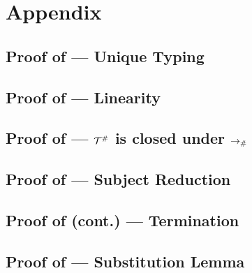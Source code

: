 \chapter{Appendix}

\section{Proof of  --- Unique Typing}
\label{unique_typing_proof}


\section{Proof of  --- Linearity}
\label{linearity_proof}


\section{Proof of  --- $\mathcal{T}^{\mathtt{\#}}$ is closed under $\mathrel{\to_{\mathtt{\#}}}$}
\label{closed_under_arrow_proof}


\section{Proof of  --- Subject Reduction}
\label{subject_reduction_proof}


\section{Proof of  (cont.) --- Termination}
\label{termination_proof}


\section{Proof of  --- Substitution Lemma}
\label{substitution_lemma_proof}



